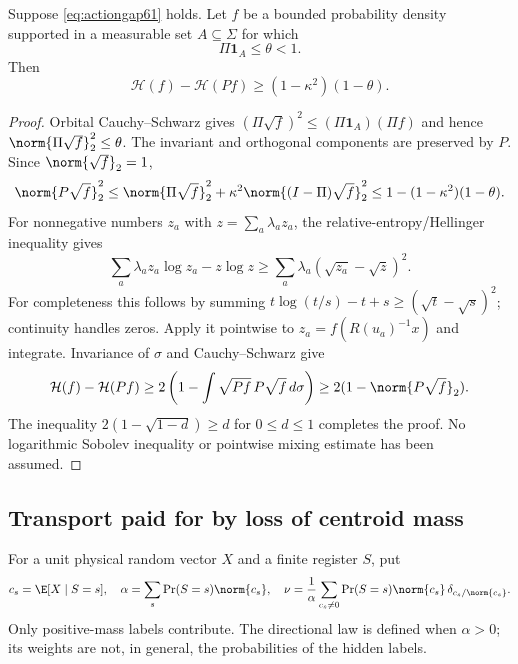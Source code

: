 \begin{lemma}\label{lem:entropydefect61}
Suppose \eqref{eq:actiongap61} holds. Let $f$ be a bounded probability
density supported in a measurable set $A\subseteq\Sigma$ for which
\[
                         \Pi\mathbf1_A\le\theta<1.
\]
Then
\begin{equation}\label{eq:entropydefect61}
 \mathcal H(f)-\mathcal H(Pf)\ge(1-\kappa^2)(1-\theta).
\end{equation}
\end{lemma}
\begin{proof}
Orbital Cauchy--Schwarz gives
$(\Pi\sqrt f)^2\le(\Pi\mathbf1_A)(\Pi f)$ and hence
$\norm{\Pi\sqrt f}_2^2\le\theta$. The invariant and orthogonal
components are preserved by $P$. Since $\norm{\sqrt f}_2=1$,
\[
 \norm{P\sqrt f}_2^2
 \le\norm{\Pi\sqrt f}_2^2+\kappa^2\norm{(I-\Pi)\sqrt f}_2^2
 \le1-(1-\kappa^2)(1-\theta).
\]
For nonnegative numbers $z_a$ with $z=\sum_a\lambda_a z_a$, the
relative-entropy/Hellinger inequality gives
\[
 \sum_a\lambda_a z_a\log z_a-z\log z
 \ge\sum_a\lambda_a(\sqrt{z_a}-\sqrt z)^2.
\]
For completeness this follows by summing
$t\log(t/s)-t+s\ge(\sqrt t-\sqrt s)^2$; continuity handles zeros.
Apply it pointwise to $z_a=f(R(u_a)^{-1}x)$ and integrate. Invariance
of $\sigma$ and Cauchy--Schwarz give
\[
 \mathcal H(f)-\mathcal H(Pf)
 \ge2\left(1-\int\sqrt{Pf}\,P\sqrt f\,d\sigma\right)
 \ge2(1-\norm{P\sqrt f}_2).
\]
The inequality $2(1-\sqrt{1-d})\ge d$ for $0\le d\le1$ completes the
proof. No logarithmic Sobolev inequality or pointwise mixing estimate
has been assumed.
\end{proof}

\subsection{Transport paid for by loss of centroid mass}
For a unit physical random vector $X$ and a finite register $S$, put
\begin{equation}\label{eq:directionlaw61}
 c_s=\E[X\mid S=s],\quad
 \alpha=\sum_s\Pr(S=s)\norm{c_s},\quad
 \nu=\frac1\alpha\sum_{c_s\ne0}\Pr(S=s)\norm{c_s}\,
                       \delta_{c_s/\norm{c_s}}.
\end{equation}
Only positive-mass labels contribute. The directional law is defined
when $\alpha>0$; its weights are not, in general, the probabilities of
the hidden labels.

